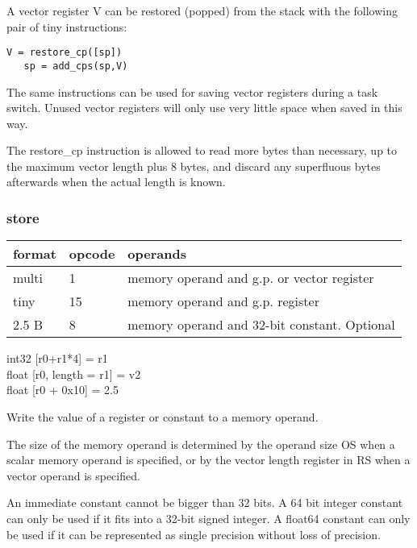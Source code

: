 \documentclass[forwardcom.tex]{subfiles}
\begin{document}
A vector register V can be restored (popped) from the stack with the following pair of tiny instructions:

\begin{lstlisting}[frame=none]
   V = restore_cp([sp])
   sp = add_cps(sp,V)
\end{lstlisting}

The same instructions can be used for saving vector registers during a task switch. Unused vector registers will only use very little space when saved in this way.
\vspace{2mm}

The restore\_cp instruction is allowed to read more bytes than necessary, up to the maximum vector length plus 8 bytes, and discard any superfluous bytes afterwards when the actual length is known.


\subsubsection{store}
\label{table:storeInstruction}
\begin{tabular}{|p{12mm}|p{12mm}|p{110mm}|}
\hline
\bfseries format & \bfseries opcode & \bfseries operands \\ \hline
multi &  1 & memory operand and g.p. or vector register \\ \hline
tiny  & 15 & memory operand and g.p. register \\ \hline
2.5 B &  8 & memory operand and 32-bit constant. Optional \\ \hline
\end{tabular}
\vspace{2mm}

int32 [r0+r1*4] = r1\\ 
float [r0, length = r1] = v2 \\
float [r0 + 0x10] = 2.5
\vspace{2mm}

Write the value of a register or constant to a memory operand.
\vspace{2mm}

The size of the memory operand is determined by the operand size OS when a scalar memory operand is specified, or by the vector length register in RS when a vector operand is specified.
\vspace{2mm}

An immediate constant cannot be bigger than 32 bits. A 64 bit integer constant can only be used if it fits into a 32-bit signed integer. A float64 constant can only be used if it can be represented as single precision without loss of precision.
\vspace{2mm}
\end{document}
